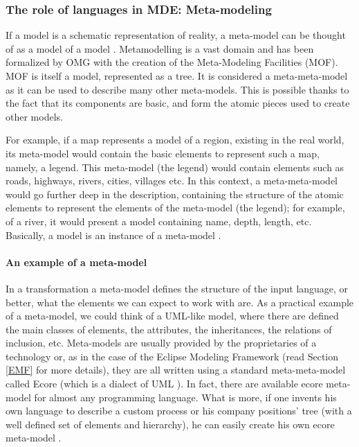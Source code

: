 \subsubsection{The role of languages in MDE: Meta-modeling}
\label{Meta-modeling}
If a model is a schematic representation of reality, a meta-model can be thought of as a model of a model \cite{AcceleoUserGuide}.
Metamodelling is a vast domain and has been formalized by OMG with the creation of the Meta-Modeling Facilities (MOF).
MOF is itself a model, represented as a tree. It is considered a meta-meta-model as it can be used to describe many other meta-models. This is possible thanks to the fact that its components are basic, and form the atomic pieces used to create other models. 

For example, if a map represents a model of a region, existing in the real world, its meta-model would contain the basic elements to represent such a map, namely, a legend. This meta-model (the legend) would contain elements such as roads, highways, rivers, cities, villages etc. In this context, a meta-meta-model would go further deep in the description, containing the structure of the atomic elements to represent the elements of the meta-model (the legend); for example, of a river, it would present a model containing name, depth, length, etc.  
Basically, a model is an instance of a meta-model \cite{UnderstandMetamodelling}. 

\paragraph{An example of a meta-model}
\label{metamodelExample}
In a transformation a meta-model defines the structure of the input language, or better, what the elements we can expect to work with are. As a practical example of a meta-model, we could think of a UML-like model, where there are defined the main classes of elements, the attributes, the inheritances, the relations of inclusion, etc. Meta-models are usually provided by the proprietaries of a technology or, as in the case of the Eclipse Modeling Framework (read Section \ref{EMF} for more details), they are all written using a standard meta-meta-model called Ecore (which is a dialect of UML \cite{EcoreAPI}). In fact, there are available ecore meta-model for almost any programming language. What is more, if one invents his own language to describe a custom process or his company positions' tree (with a well defined set of elements and hierarchy), he can easily create his own ecore meta-model \cite{EcoreExample}.

